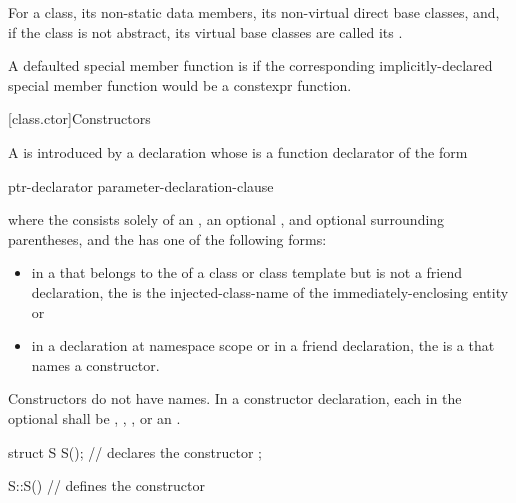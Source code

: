\pnum
For a class, its non-static data members, its non-virtual direct base classes,
and, if the class is not abstract, its virtual base
classes are called its .

\pnum
A defaulted special member function is
%
if the corresponding implicitly-declared special member function
would be a constexpr function.

[class.ctor]{Constructors}%
%
%

\pnum
A  is introduced by a declaration
whose  is a
function declarator of the form
\begin{ncbnf}
ptr-declarator \terminal{(} parameter-declaration-clause \terminal{)}  
\end{ncbnf}
where the  consists solely of an
, an optional ,
and optional surrounding parentheses, and the  has
one of the following forms:
\begin{itemize}
\item
in a  that belongs to the
 of a class or class template
but is not a friend
declaration, the  is the
injected-class-name of the immediately-enclosing entity or

\item
in a declaration at namespace scope or in a friend declaration, the
 is a  that names a
constructor.
\end{itemize}
Constructors do not have names.
In a constructor declaration, each  in the optional
 shall be , ,
, or an .
\begin{example}
\begin{codeblock}
struct S {
  S();              // declares the constructor
};

S::S() { }          // defines the constructor
\end{codeblock}
\end{example}

